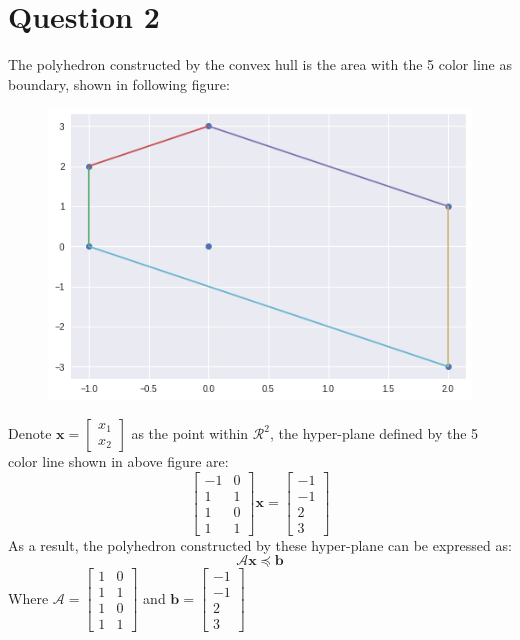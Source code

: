 \documentclass[10pt,a4paper]{article}
\begin{document}
\section*{Question 2}
The polyhedron constructed by the convex hull is the area with the 5 color line as boundary, shown in following figure:
\begin{figure}[H]
	\begin{center}
		\includegraphics[scale=0.4]{Q2.png}
	\end{center}
\end{figure}
Denote $\mathbf{x} = \begin{bmatrix}
x_{1} \\
x_{2}
\end{bmatrix}$ as the point within $\mathcal{R}^{2}$, the hyper-plane defined by the 5 color line shown in above figure are:
\begin{equation*}
	\begin{bmatrix}
		-1 & 0 \\
		1 & 1 \\
		1 & 0 \\
		1 & 1
	\end{bmatrix} \mathbf{x} = 
	\begin{bmatrix}
		-1 \\
		-1 \\
		2 \\
		3
	\end{bmatrix}
\end{equation*}
As a result, the polyhedron constructed by these hyper-plane can be expressed as:
\begin{equation*}
	\mathcal{A} \mathbf{x} \preceq \mathbf{b}
\end{equation*}
Where $\mathcal{A} = \begin{bmatrix}
1 & 0 \\
1 & 1 \\
1 & 0 \\
1 & 1
\end{bmatrix}$ and $\mathbf{b} = \begin{bmatrix}
-1 \\
-1 \\
2 \\
3
\end{bmatrix}$
\end{document}

